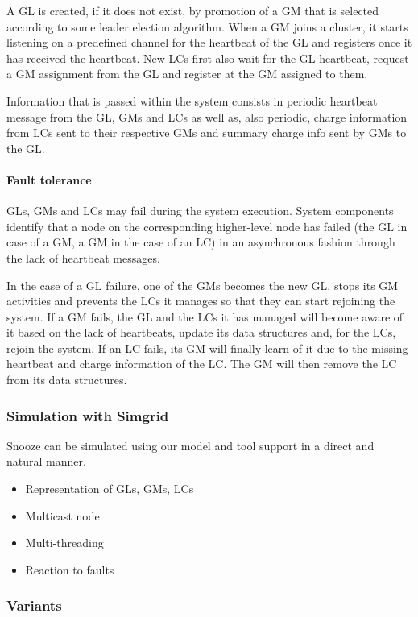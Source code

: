 A GL is created, if it does not exist, by promotion of a GM that is
selected according to some leader election algorithm. When a GM joins
a cluster, it starts listening on a predefined channel for the
heartbeat of the GL and registers once it has received the
heartbeat. New LCs first also wait for the GL heartbeat, request a GM
assignment from the GL and register at the GM assigned to them.

Information that is passed within the system consists in periodic
heartbeat message from the GL, GMs and LCs as well as, also periodic,
charge information from LCs sent to their respective GMs and summary
charge info sent by GMs to the GL.


\paragraph{Fault tolerance} 

GLs, GMs and LCs may fail during the system execution. System
components identify that a node on the corresponding higher-level node
has failed (the GL in case of a GM, a GM in the case of an LC) in an
asynchronous fashion through the lack of heartbeat messages.

In the case of a GL failure, one of the GMs becomes the new GL, stops
its GM activities and prevents the LCs it manages so that they can
start rejoining the system. If a GM fails, the GL and the LCs it has
managed will become aware of it based on the lack of heartbeats,
update its data structures and, for the LCs, rejoin the system. If an
LC fails, its GM will finally learn of it due to the missing heartbeat
and charge information of the LC. The GM will then remove the LC from
its data structures.

\subsubsection{Simulation with Simgrid}

Snooze can be simulated using our model and tool support in a direct
and natural manner.

\begin{itemize}
  \item Representation of GLs, GMs, LCs
  \item Multicast node
  \item Multi-threading
  \item Reaction to faults
\end{itemize}

\subsubsection{Variants}


